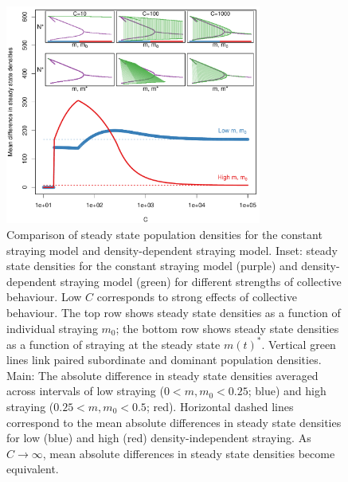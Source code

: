 \documentclass{revtex4}
\begin{document}
\begin{figure}
  \captionsetup{justification=raggedright,
singlelinecheck=false
}
\centering
\includegraphics[width=0.75\textwidth]{fig_meandiff2.pdf}
\caption{
Comparison of steady state population densities for the constant straying model and density-dependent straying model.
Inset: steady state densities for the constant straying model (purple) and density-dependent straying model (green) for different strengths of collective behaviour.
Low $C$ corresponds to strong effects of collective behaviour.
The top row shows steady state densities as a function of individual straying $m_0$; the bottom row shows steady state densities as a function of straying at the steady state $m(t)^*$.
Vertical green lines link paired subordinate and dominant population densities.
Main: The absolute difference in steady state densities averaged across intervals of low straying ($0 < m,m_0 < 0.25$; blue) and high straying ($0.25 < m,m_0 < 0.5$; red).
Horizontal dashed lines correspond to the mean absolute differences in steady state densities for low (blue) and high (red) density-independent straying.
As $C\rightarrow\infty$, mean absolute differences in steady state densities become equivalent.
} \label{fig:cb}
\end{figure}
\end{document}
